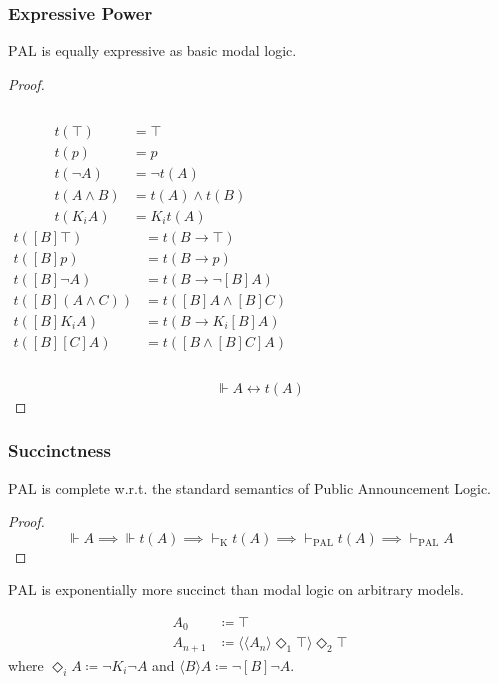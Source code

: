 \documentclass[UTF8,11pt,colorlinks,compress,openany]{beamer}%
\begin{document}
\begin{frame}\frametitle{Expressive Power}
\setlength\abovedisplayskip{0pt}
\setlength\belowdisplayskip{0pt}
\begin{theorem}
$\mathrm{PAL}$ is equally expressive as basic modal logic.
\end{theorem}
\begin{proof}
\begin{columns}
\begin{align*}
t(\top)&=\top\\
t(p)&=p\\
t(\neg A)&=\neg t(A)\\
t(A\wedge B)&=t(A)\wedge t(B)\\
t(K_iA)&=K_i t(A)
\end{align*}
\begin{align*}
t([B]\top)&=t(B\to\top)\\
t([B]p)&=t(B\to p)\\
t([B]\neg A)&=t(B\to\neg[B]A)\\
t([B](A\wedge C))&=t([B]A\wedge[B]C)\\
t([B]K_iA)&=t(B\to K_i[B]A)\\
t([B][C]A)&=t([B\wedge[B]C]A)
\end{align*}
\end{columns}
\[\Vdash A\leftrightarrow t(A)\]
\end{proof}
\end{frame}

\begin{frame}\frametitle{Succinctness}
\setlength\abovedisplayskip{0pt}
\setlength\belowdisplayskip{0pt}
\begin{theorem}
$\mathrm{PAL}$ is complete w.r.t. the standard semantics of Public Announcement Logic.
\end{theorem}
\begin{proof}
\[\Vdash A\implies\Vdash t(A)\implies \vdash_{\mathrm{K}} t(A)\implies\vdash_{\mathrm{PAL}}t(A)\implies\vdash_{\mathrm{PAL}}A\]
\end{proof}
\begin{theorem}
$\mathrm{PAL}$ is exponentially more succinct than modal logic on arbitrary
models.
\end{theorem}\vspace{-2ex}
\begin{align*}
 A_0&\coloneqq \top\\
 A_{n+1}&\coloneqq \langle\langle A_n\rangle\Diamond_1\top\rangle\Diamond_2\top
\end{align*}
where $\Diamond_i A\coloneqq \neg K_i\neg A$ and $\langle B\rangle A\coloneqq \neg[B]\neg A$.
\end{frame}
\end{document}
